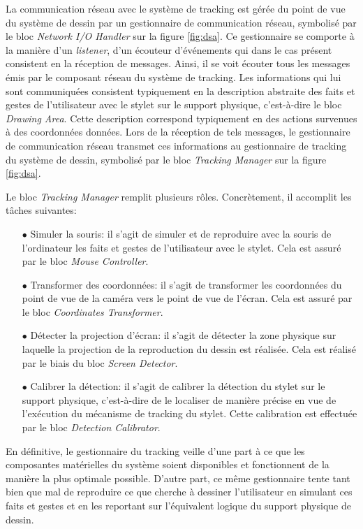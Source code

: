 \documentclass[11pt,a4paper,oldfontcommands]{memoir}
\begin{document}
La communication réseau avec le système de tracking est gérée du point de vue du système de dessin par un gestionnaire de communication réseau, symbolisé par le bloc \textit{Network I/O Handler} sur la figure \ref{fig:dsa}. Ce gestionnaire se comporte à la manière d'un \textit{listener}, d'un écouteur d'événements qui dans le cas présent consistent en la réception de messages. Ainsi, il se voit écouter tous les messages émis par le composant réseau du système de tracking. Les informations qui lui sont communiquées consistent typiquement en la description abstraite des faits et gestes de l'utilisateur avec le stylet sur le support physique, c'est-à-dire le bloc \textit{Drawing Area}. Cette description correspond typiquement en des actions survenues à des coordonnées données. Lors de la réception de tels messages, le gestionnaire de communication réseau transmet ces informations au gestionnaire de tracking du système de dessin, symbolisé par le bloc \textit{Tracking Manager} sur la figure \ref{fig:dsa}.

Le bloc \textit{Tracking Manager} remplit plusieurs rôles. Concrètement, il accomplit les tâches suivantes:

\begin{itemize}
\item[$\bullet$] Simuler la souris: il s'agit de simuler et de reproduire avec la souris de l'ordinateur les faits et gestes de l'utilisateur avec le stylet. Cela est assuré par le bloc \textit{Mouse Controller}.
\item[$\bullet$] Transformer des coordonnées: il s'agit de transformer les coordonnées du point de vue de la caméra vers le point de vue de l'écran. Cela est assuré par le bloc \textit{Coordinates Transformer}.
\item[$\bullet$] Détecter la projection d'écran: il s'agit de détecter la zone physique sur laquelle la projection de la reproduction du dessin est réalisée. Cela est réalisé par le biais du bloc \textit{Screen Detector}.
\item[$\bullet$] Calibrer la détection: il s'agit de calibrer la détection du stylet sur le support physique, c'est-à-dire de le localiser de manière précise en vue de l'exécution du mécanisme de tracking du stylet. Cette calibration est effectuée par le bloc \textit{Detection Calibrator}.
\end{itemize}

En définitive, le gestionnaire du tracking veille d'une part à ce que les composantes matérielles du système soient disponibles et fonctionnent de la manière la plus optimale possible. D'autre part, ce même gestionnaire tente tant bien que mal de reproduire ce que cherche à dessiner l'utilisateur en simulant ces faits et gestes et en les reportant sur l'équivalent logique du support physique de dessin.
\end{document}
